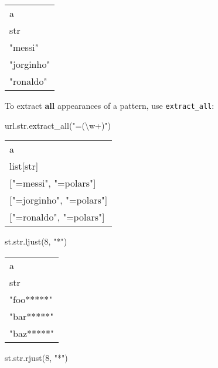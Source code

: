 \documentclass[
  letterpaper,
  DIV=11,
  numbers=noendperiod]{scrartcl}
\newenvironment{Shaded}{\begin{snugshade}}{\end{snugshade}}
\newcommand{\BuiltInTok}[1]{\textcolor[rgb]{0.00,0.23,0.31}{#1}}
\newcommand{\DecValTok}[1]{\textcolor[rgb]{0.68,0.00,0.00}{#1}}
\newcommand{\NormalTok}[1]{\textcolor[rgb]{0.00,0.23,0.31}{#1}}
\newcommand{\StringTok}[1]{\textcolor[rgb]{0.13,0.47,0.30}{#1}}
\begin{document}
\begin{longtable}[]{@{}l@{}}
\toprule()
a \\
str \\
\midrule()
\endhead
"messi" \\
"jorginho" \\
"ronaldo" \\
\bottomrule()
\end{longtable}

To extract \textbf{all} appearances of a pattern, use
\texttt{extract\_all}:

\begin{Shaded}
\begin{Highlighting}[]
\NormalTok{url.}\BuiltInTok{str}\NormalTok{.extract\_all(}\StringTok{"=(\textbackslash{}w+)"}\NormalTok{)}
\end{Highlighting}
\end{Shaded}

\begin{longtable}[]{@{}l@{}}
\toprule()
a \\
list{[}str{]} \\
\midrule()
\endhead
{[}"=messi", "=polars"{]} \\
{[}"=jorginho", "=polars"{]} \\
{[}"=ronaldo", "=polars"{]} \\
\bottomrule()
\end{longtable}

\begin{Shaded}
\begin{Highlighting}[]
\NormalTok{st.}\BuiltInTok{str}\NormalTok{.ljust(}\DecValTok{8}\NormalTok{, }\StringTok{"*"}\NormalTok{)}
\end{Highlighting}
\end{Shaded}

\begin{longtable}[]{@{}l@{}}
\toprule()
a \\
str \\
\midrule()
\endhead
"foo*****" \\
"bar*****" \\
"baz*****" \\
\bottomrule()
\end{longtable}

\begin{Shaded}
\begin{Highlighting}[]
\NormalTok{st.}\BuiltInTok{str}\NormalTok{.rjust(}\DecValTok{8}\NormalTok{, }\StringTok{"*"}\NormalTok{)}
\end{Highlighting}
\end{Shaded}
\end{document}
